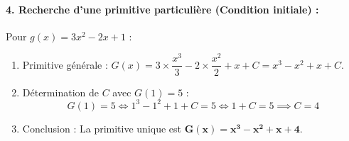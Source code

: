 \documentclass[12pt,a4paper]{article}
\begin{document}
\begin{tcolorbox}[colback=gray!5!white,colframe=myblue,title=\textbf{Correction détaillée}]
\paragraph{4. Recherche d'une primitive particulière (Condition initiale) :}
Pour $g(x) = 3x^2 - 2x + 1$ :
\begin{enumerate}
    \item Primitive générale : $G(x) = 3 \times \dfrac{x^3}{3} - 2 \times \dfrac{x^2}{2} + x + C = x^3 - x^2 + x + C$.
    \item Détermination de $C$ avec $G(1) = 5$ :
    \[
    G(1) = 5 \iff 1^3 - 1^2 + 1 + C = 5 \iff 1 + C = 5 \implies C = 4
    \]
    \item Conclusion : La primitive unique est $\mathbf{G(x) = x^3 - x^2 + x + 4}$.
\end{enumerate}

\end{tcolorbox}
\end{document}
